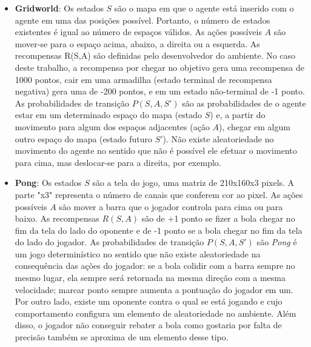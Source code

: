 \begin{itemize}
\item \textbf{Gridworld}:
Os estados $S$ são o mapa em que o agente está inserido com o agente em uma das posições possível.
Portanto, o número de estados existentes é igual ao número de espaços válidos.
As ações possíveis $A$ são mover-se para o espaço acima, abaixo, a direita ou a esquerda.
As recompensas R(S,A) são definidas pelo desenvolvedor do ambiente.
No caso deste trabalho, a recompensa por chegar no objetivo gera uma recompensa de 1000 pontos, cair em uma armadilha (estado terminal de recompensa negativa) gera uma de -200 pontos, e em um estado não-terminal de -1 ponto.
As probabilidades de transição $P(S,A,S')$ são as probabilidades de o agente estar em um determinado espaço do mapa (estado $S$) e, a partir do movimento para algum dos espaços adjacentes (ação $A$), chegar em algum outro espaço do mapa (estado futuro $S'$).
Não existe aleatoriedade no movimento do agente no sentido que não é possível ele efetuar o movimento para cima, mas deslocar-se para a direita, por exemplo.

\item \textbf{Pong}:
Os estados $S$ são a tela do jogo, uma matriz de 210x160x3 pixels.
A parte "x3"{} representa o número de canais que conferem cor ao pixel.
As ações possíveis $A$ são mover a barra que o jogador controla para cima ou para baixo.
As recompensas $R(S,A)$ são de +1 ponto se fizer a bola chegar no fim da tela do lado do oponente e de -1 ponto se a bola chegar no fim da tela do lado do jogador.
As probabilidades de transição $P(S,A,S')$ são
\textit{Pong} é um jogo determinístico no sentido que não existe aleatoriedade na consequência das ações do jogador: se a bola colidir com a barra sempre no mesmo lugar, ela sempre será retornada na mesma direção com a mesma velocidade; marcar ponto sempre aumenta a pontuação do jogador em um.
Por outro lado, existe um oponente contra o qual se está jogando e cujo comportamento configura um elemento de aleatoriedade no ambiente.
Além disso, o jogador não conseguir rebater a bola como gostaria por falta de precisão também se aproxima de um elemento desse tipo.


\end{itemize}
